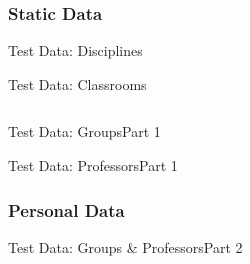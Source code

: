 \documentclass{beamer}
\providecommand{\rootdir}{../doc}
\newcommand{\resizeinput}[2][1]{%
  \resizebox{#1\textwidth}{!}{}%
}
\begin{document}
\subsubsection{Static Data}

\begin{frame}{Test Data: Disciplines}
  \centering
  \resizeinput[.7]{\rootdir/TestResults/TestData/Disciplines}
\end{frame}

\begin{frame}{Test Data: Classrooms}
  \begin{columns}
    \begin{column}{.5\textwidth}
      \resizeinput[.8]{\rootdir/TestResults/TestData/Classrooms}
    \end{column}
    \begin{column}{.4\textwidth}
      \resizeinput{\rootdir/TestResults/TestData/Requirements}
    \end{column}
  \end{columns}
\end{frame}

\begin{frame}{Test Data: Groups}{Part 1}
  \resizeinput{\rootdir/TestResults/TestData/Groups-Static}
\end{frame}

\begin{frame}{Test Data: Professors}{Part 1}
  \centering
  \resizeinput[.65]{\rootdir/TestResults/TestData/Professors-Static}
\end{frame}

\subsubsection{Personal Data}

\begin{frame}{Test Data: Groups \& Professors}{Part 2}
  \begin{columns}[t]
    \begin{column}{.5\textwidth}
      \resizeinput{\rootdir/TestResults/TestData/Groups-Personal}
    \end{column}
    \begin{column}{.5\textwidth}
      \resizeinput{\rootdir/TestResults/TestData/Professors-Personal}
    \end{column}
  \end{columns}
\end{frame}
\end{document}
